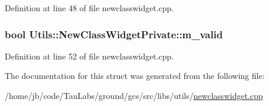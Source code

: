 \-Definition at line 48 of file newclasswidget.\-cpp.

\hypertarget{struct_utils_1_1_new_class_widget_private_a0a15874cfaa308a9c4d6b476ec89cae6}{
\subsubsection[{m\-\_\-valid}]{\setlength{\rightskip}{0pt plus 5cm}bool {\bf \-Utils\-::\-New\-Class\-Widget\-Private\-::m\-\_\-valid}}}\label{struct_utils_1_1_new_class_widget_private_a0a15874cfaa308a9c4d6b476ec89cae6}


\-Definition at line 52 of file newclasswidget.\-cpp.



\-The documentation for this struct was generated from the following file\-:\begin{DoxyCompactItemize}
\item 
/home/jb/code/\-Tau\-Labs/ground/gcs/src/libs/utils/\hyperlink{newclasswidget_8cpp}{newclasswidget.\-cpp}\end{DoxyCompactItemize}
